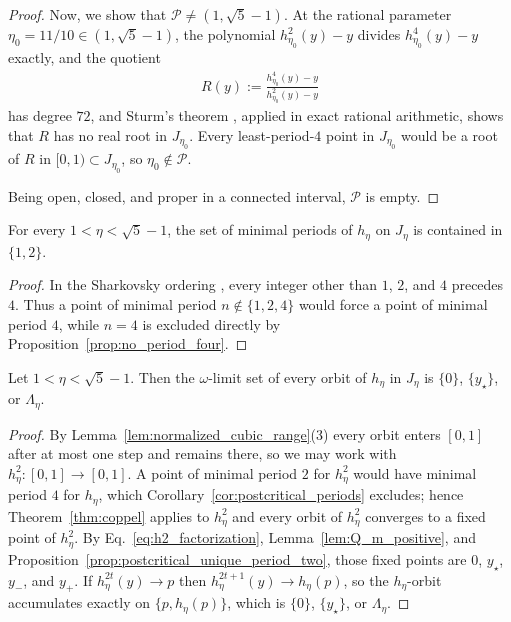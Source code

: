 \documentclass{article}
\begin{document}
\begin{proof}
Now, we show that $\mathcal P\ne(1,\sqrt5-1)$. At the rational parameter $\eta_0=11/10 \in (1,\sqrt5-1)$,
the polynomial $h_{\eta_0}^2(y)-y$ divides $h_{\eta_0}^4(y)-y$ exactly, and the
quotient
\begin{align}
    R(y):=\frac{h_{\eta_0}^4(y)-y}{h_{\eta_0}^2(y)-y}
    \label{eq:period4_quotient}
\end{align}
has degree $72$, and Sturm's theorem
\citep[Theorem~2.50]{basu2006algorithms}, applied in exact rational
arithmetic,
shows that $R$ has no real root in $J_{\eta_0}$. Every least-period-$4$ point in
$J_{\eta_0}$ would be a root of $R$ in $[0,1)\subset J_{\eta_0}$, so
$\eta_0\notin\mathcal P$.

Being open, closed, and proper in a connected interval, $\mathcal P$ is empty.
\end{proof}

\begin{corollary}
\label{cor:postcritical_periods}
For every $1<\eta<\sqrt5-1$, the set of minimal periods of $h_\eta$ on $J_\eta$
is contained in $\{1,2\}$.
\end{corollary}

\begin{proof}
In the Sharkovsky ordering \citep[Theorem 2.8]{elaydi2007discrete}, every integer
other than $1$, $2$, and $4$ precedes $4$. Thus a point of minimal period
$n\notin\{1,2,4\}$ would force a point of minimal period $4$, while $n=4$ is
excluded directly by Proposition~\ref{prop:no_period_four}.
\end{proof}

\begin{corollary}
\label{cor:postcritical_exact_orbits}
Let $1<\eta<\sqrt5-1$. Then the $\omega$-limit set of every orbit of $h_\eta$ in
$J_\eta$ is $\{0\}$, $\{y_\star\}$, or $\Lambda_\eta$.
\end{corollary}

\begin{proof}
By Lemma~\ref{lem:normalized_cubic_range}(3) every orbit enters $[0,1]$ after at
most one step and remains there, so we may work with
$h_\eta^2\colon[0,1]\to[0,1]$. A point of minimal period $2$ for $h_\eta^2$ would
have minimal period $4$ for $h_\eta$, which Corollary~\ref{cor:postcritical_periods}
excludes; hence Theorem~\ref{thm:coppel} applies to $h_\eta^2$ and every orbit
of $h_\eta^2$ converges to a fixed point of $h_\eta^2$. By
Eq.~\eqref{eq:h2_factorization}, Lemma~\ref{lem:Q_m_positive}, and
Proposition~\ref{prop:postcritical_unique_period_two}, those fixed points are
$0$, $y_\star$, $y_-$, and $y_+$. If $h_\eta^{2t}(y)\to p$ then
$h_\eta^{2t+1}(y)\to h_\eta(p)$, so the $h_\eta$-orbit accumulates exactly on
$\{p,h_\eta(p)\}$, which is $\{0\}$, $\{y_\star\}$, or $\Lambda_\eta$.
\end{proof}
\end{document}
